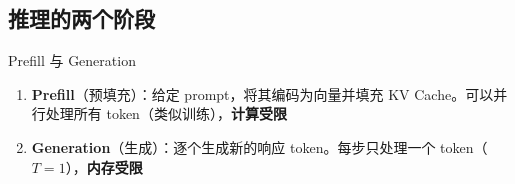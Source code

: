 \subsection{推理的两个阶段}

\begin{importantbox}{Prefill 与 Generation}
\begin{enumerate}
    \item \textbf{Prefill}（预填充）：给定 prompt，将其编码为向量并填充 KV Cache。可以并行处理所有 token（类似训练），\textbf{计算受限}
    \item \textbf{Generation}（生成）：逐个生成新的响应 token。每步只处理一个 token（$T=1$），\textbf{内存受限}
\end{enumerate}
\end{importantbox}

